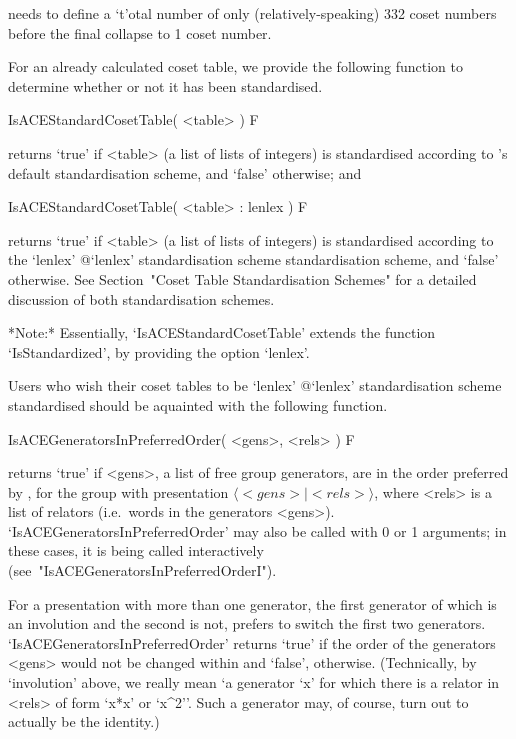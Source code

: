 {\ACE} needs to define a `t'otal number of only  (relatively-speaking)
332 coset numbers before the final collapse to 1 coset number.

For an already  calculated  coset  table,  we  provide  the  following
function to determine whether or not it has been standardised.

\>IsACEStandardCosetTable( <table> ) F

returns  `true'  if  <table>  (a  list  of  lists  of   integers)   is
standardised according to {\GAP}'s default standardisation scheme, and
`false' otherwise; and

\>IsACEStandardCosetTable( <table> : lenlex ) F

returns  `true'  if  <table>  (a  list  of  lists  of   integers)   is
standardised  according  to  the   `lenlex'{\undoquotes{}    {@`lenlex'    standardisation    scheme}}
standardisation scheme,  and  `false'  otherwise.  See  Section~"Coset
Table Standardisation Schemes"  for  a  detailed  discussion  of  both
standardisation schemes.

*Note:*
Essentially, `IsACEStandardCosetTable'  extends  the  {\GAP}  function
`IsStandardized', by providing the option `lenlex'.

Users     who     wish     their     coset      tables      to      be
`lenlex'{\undoquotes{} {@`lenlex'
standardisation scheme}} standardised should  be  aquainted  with  the
following function.

\>IsACEGeneratorsInPreferredOrder( <gens>, <rels> ) F
\label{IsACEGeneratorsInPreferredOrderNI}

returns `true' if <gens>, a list of free group generators, are in  the
order preferred by {\ACE}, for the group  with  presentation  $\langle
<gens> \mid  <rels>\rangle$,  where  <rels>  is  a  list  of  relators
(i.e.~words         in         the         generators         <gens>).
`IsACEGeneratorsInPreferredOrder' may also  be  called  with  0  or  1
arguments;  in  these  cases,  it  is   being   called   interactively
(see~"IsACEGeneratorsInPreferredOrderI").

For a presentation with more than one generator, the  first  generator
of which is an involution and the second is  not,  {\ACE}  prefers  to
switch the  first  two  generators.  `IsACEGeneratorsInPreferredOrder'
returns `true' if the order of the  generators  <gens>  would  not  be
changed  within  {\ACE}  and  `false',  otherwise.  (Technically,   by
\lq{}involution' above, we really mean \lq{}a generator `x' for  which
there is a relator in <rels> of form `x*x' or `x^2''. Such a generator
may, of course, turn out to actually be the identity.)

